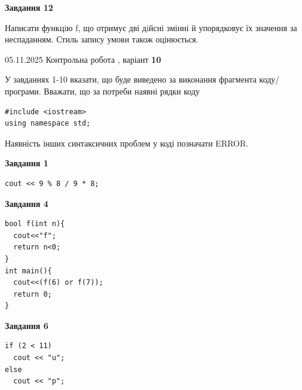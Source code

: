 \documentclass[12pt, ukrainian]{article}
\begin{document}
{\begin {large}
\begin{minipage}[t]{11.0cm}
\begin{center}
\textbf{Завдання 12}
\end{center}

Написати функцiю f, що отримує дві дiйсні змінні й упорядковує їх значення за неспаданням. Стиль запису умови також оцінюється.\par

\end{minipage}

\end {large}}
\newpage

{\Large{05.11.2025 Контрольна робота , варіант  \No \textbf { 10 }\par}}
{
\begin {large}
У завданнях 1-10 вказати, що буде виведено за виконання фрагмента коду/про\-гра\-ми.
Вважати, що за потреби наявні рядки коду
\begin{verbatim}
#include <iostream>
using namespace std;
\end{verbatim}
Наявність інших синтаксичних проблем у коді позначати ERROR.

\begin{minipage}[t]{7.0cm}

\begin{center}
\textbf{Завдання 1}
\end{center}
\vspace{-8mm}

\begin{verbatim}
cout << 9 % 8 / 9 * 8;
\end{verbatim}



\begin{center}
\textbf{Завдання 4}
\end{center}
\vspace{-8mm}

\begin{verbatim}
bool f(int n){
  cout<<"f";
  return n<0;
}
int main(){
  cout<<(f(6) or f(7));
  return 0;
}
\end{verbatim}



\begin{center}
\textbf{Завдання 6}
\end{center}
\vspace{-8mm}

\begin{verbatim}
if (2 < 11)
  cout << "u";
else
  cout << "p";
\end{verbatim}




\end{minipage}
\end{large}}
\end{document}
